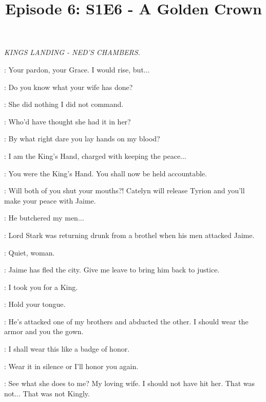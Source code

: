 

\title{Episode 6: S1E6 - A Golden Crown}
\author{}
\date{}
\maketitle




\scene

\textit{KINGS LANDING - NED'S CHAMBERS.} 


\NED:  Your pardon, your Grace. I would rise, but$\ldots$ 

\CERSEI:  Do you know what your wife has done? 

\NED:  She did nothing I did not command. 

\ROBERT:  Who'd have thought she had it in her? 

\CERSEI:  By what right dare you lay hands on my blood? 

\NED:  I am the King's Hand, charged with keeping the peace$\ldots$ 

\CERSEI:  You were the King's Hand. You shall now be held accountable. 

\ROBERT:  Will both of you shut your mouths?! Catelyn will release Tyrion and you'll make your peace with Jaime. 

\NED:  He butchered my men$\ldots$ 

\CERSEI:  Lord Stark was returning drunk from a brothel when his men attacked Jaime. 

\ROBERT:  Quiet, woman. 

\NED:  Jaime has fled the city. Give me leave to bring him back to justice. 

\CERSEI:  I took you for a King. 

\ROBERT:  Hold your tongue. 

\CERSEI:  He's attacked one of my brothers and abducted the other. I should wear the armor and you the gown. 


\CERSEI: I shall wear this like a badge of honor. 

\ROBERT:  Wear it in silence or I'll honor you again. 


\ROBERT:  See what she does to me? My loving wife. I should not have hit her. That was not$\ldots$ That was not Kingly.  

